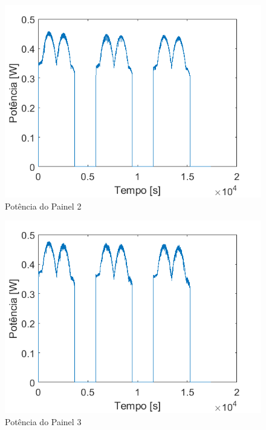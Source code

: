 \begin{figure}[!htpb]
\begin{center}
\includegraphics[scale=0.5]{figures/testPanel2Power.png}
\caption{Potência do Painel 2}
\label{figura_teste_potencia_painel2}
\end{center}
\end{figure}

\begin{figure}[!htpb]
\begin{center}
\includegraphics[scale=0.5]{figures/testPanel3Power.png}
\caption{Potência do Painel 3}
\label{figura_teste_potencia_painel3}
\end{center}
\end{figure}

